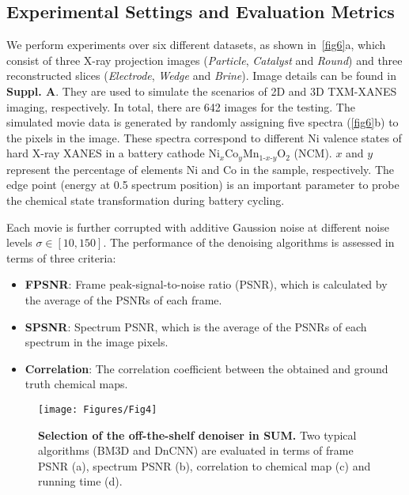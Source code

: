 \documentclass[10pt,twocolumn,letterpaper]{article}
\begin{document}
\subsection{Experimental Settings and Evaluation Metrics}
We perform experiments over six different datasets, as shown in~\cref{fig6}a, which consist of three X-ray projection images (\textit{Particle}, \textit{Catalyst} and \textit{Round}) and three reconstructed slices (\textit{Electrode}, \textit{Wedge} and \textit{Brine}). Image details can be found in \textbf{Suppl. A}. They are used to simulate the scenarios of 2D and 3D TXM-XANES imaging, respectively. In total, there are 642 images for the testing. The simulated movie data is generated by randomly assigning five spectra (\cref{fig6}b) to the pixels in the image. These spectra correspond to different Ni valence states of hard X-ray XANES in a battery cathode $\mathrm{Ni}_x\mathrm{Co}_y\mathrm{Mn}_{1\text{-}x\text{-}y}\mathrm{O}_2$ (NCM). $x$ and $y$ represent the percentage of elements Ni and Co in the sample, respectively. The edge point (energy at 0.5 spectrum position) is an important parameter to probe the chemical state transformation during battery cycling. 

Each movie is further corrupted with additive Gaussion noise at different noise levels $\sigma\in [10, 150]$. The performance of the denoising algorithms is assessed in terms of three criteria:
\vspace{-2pt}
\begin{itemize}
  \setlength\itemsep{0.2em}
    \item \textbf{FPSNR}: Frame peak-signal-to-noise ratio (PSNR), which is calculated by the average of the PSNRs of each frame.
    \item \textbf{SPSNR}: Spectrum PSNR, which is the average of the PSNRs of each spectrum in the image pixels.
    \item \textbf{Correlation}: The correlation coefficient between the obtained and ground truth chemical maps. 
\end{itemize}

\begin{figure}
  \centering
    \texttt{[image: Figures/Fig4]}
    \vspace{-18pt}
    \caption{\textbf{Selection of the off-the-shelf denoiser in SUM.} Two typical algorithms (BM3D and DnCNN) are evaluated in terms of frame PSNR (a), spectrum PSNR (b), correlation to chemical map (c) and running time (d).}
    \vspace{-10pt}
    \label{fig4}
\end{figure} 
\end{document}
